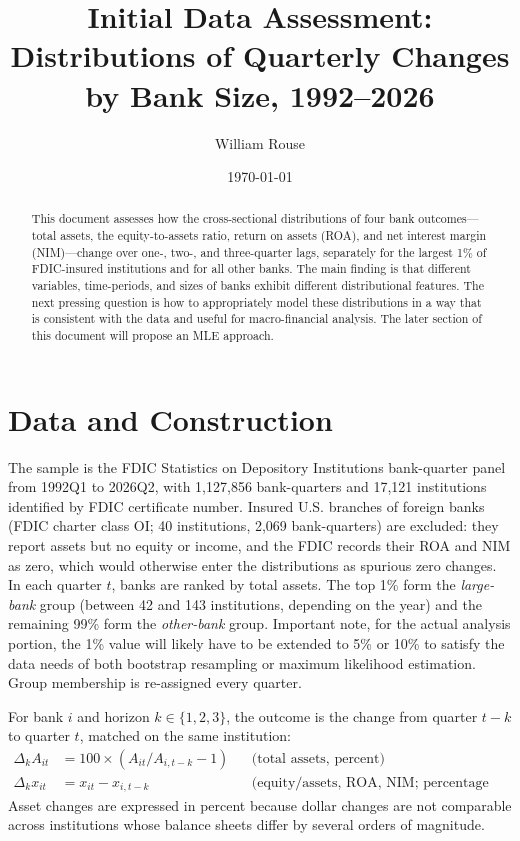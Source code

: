 \documentclass[11pt]{article}
\title{Initial Data Assessment:\\
       Distributions of Quarterly Changes by Bank Size, 1992--2026}
\author{William Rouse}
\date{\today}
\begin{document}
\maketitle

\begin{abstract}
\noindent
This document assesses how the cross-sectional distributions of four bank outcomes---total assets, the equity-to-assets ratio, return on assets (ROA), and net interest margin (NIM)---change over one-, two-, and three-quarter lags, separately for the largest 1\% of FDIC-insured institutions and for all other banks. The main finding is that different variables, time-periods, and sizes of banks exhibit different distributional features. The next pressing question is how to appropriately model these distributions in a way that is consistent with the data and useful for macro-financial analysis. The later section of this document will propose an MLE approach.
\end{abstract}

\section{Data and Construction}\label{sec:data}

The sample is the FDIC Statistics on Depository Institutions bank-quarter panel from 1992Q1 to 2026Q2, with 1{,}127{,}856 bank-quarters and 17{,}121 institutions identified by FDIC certificate number. Insured U.S. branches of foreign banks (FDIC charter class OI; 40 institutions, 2{,}069 bank-quarters) are excluded: they report assets but no equity or income, and the FDIC records their ROA and NIM as zero, which would otherwise enter the distributions as spurious zero changes. In each quarter $t$, banks are ranked by total assets. The top 1\% form the \emph{large-bank} group (between 42 and 143 institutions, depending on the year) and the remaining 99\% form the \emph{other-bank} group. Important note, for the actual analysis portion, the 1\% value will likely have to be extended to 5\% or 10\% to satisfy the data needs of both bootstrap resampling or maximum likelihood estimation. Group membership is re-assigned every quarter.

For bank $i$ and horizon $k \in \{1,2,3\}$, the outcome is the change from quarter $t-k$ to quarter $t$, matched on the same institution:
\begin{align*}
  \Delta_k A_{it} &= 100 \times \left( A_{it} / A_{i,t-k} - 1 \right) && \text{(total assets, percent)} \\
  \Delta_k x_{it} &= x_{it} - x_{i,t-k} && \text{(equity/assets, ROA, NIM; percentage points)}
\end{align*}
Asset changes are expressed in percent because dollar changes are not comparable across institutions whose balance sheets differ by several orders of magnitude.
\end{document}
